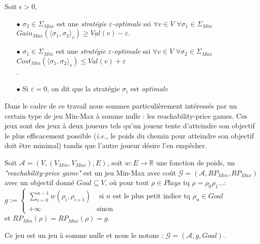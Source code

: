 \begin{defi}
	Soit $\epsilon > 0$,
	\begin{enumerate}
	\item[$\bullet$] $\sigma _{2} \in \Sigma _{Max}$ est une \textit{stratégie $\varepsilon$-optimale} ssi $\forall v \in V $ $ \forall \sigma _{1}\in \Sigma_{Min}$ $ Gain_{Max}(\langle \sigma _{1},\sigma _{2} \rangle_v) \geq \underline{Val}(v) - \varepsilon . $\\ 
	\item[$\bullet$] $\sigma _{1} \in \Sigma _{Min}$ est une \textit{stratégie $\varepsilon$-optimale} ssi $\forall v \in V $ $ \forall \sigma _{2}\in \Sigma_{Max}$ $Cost_{Min}(\langle \sigma _{1},\sigma _{2} \rangle_v) \leq \overline{Val}(v) + \varepsilon $\\ .
	\item[$\bullet$] Si $\varepsilon = 0$, on dit que la stratégie $\sigma _{i}$ est \textit{optimale}
	\end{enumerate}
\end{defi}

Dans le cadre de ce travail nous sommes particulièrement intéressés par un certain type de jeu Min-Max à somme nulle : les \og reachability-price games\fg. Ces jeux sont des jeux à deux joueurs tels qu'un joueur tente d'atteindre son objectif le plus efficacement possible (\emph{i.e.,} le poids du chemin pour atteindre son objectif doit être minimal) tandis que l'autre joueur désire l'en empêcher. 

\begin{defi}
	Soit $\mathcal{A} = (V, (V_{Min}, V_{Max}), E) $, soit $w: E \rightarrow \mathbb{R}$ une fonction de poids,
	un \textit{"reachability-price game"} est un jeu Min-Max avec coût $\mathcal{G} = (\mathcal{A},RP_{Min},RP_{Max})$\\ avec un objectif donné $Goal \subseteq V$, où pour tout $\rho \in Plays$ tq $\rho = \rho _{0}\rho _{1}...$:\\
	
	$g :=\begin{cases}
									\sum_{i = 0}^{n-1} w(\rho_{i},\rho_{i+1}) & \text{ si } n \text{ est le plus petit indice tq } \rho_{n}\in 					  Goal\\
									+\infty & \text{sinon}
									\end{cases}$ \\
	et $RP_{Min}(\rho)=RP_{Max}(\rho) = g$.
									
  \noindent Ce jeu est un jeu à somme nulle et nous le notons : $\mathcal{G} = (\mathcal{A}, g , Goal)$.
\end{defi}

